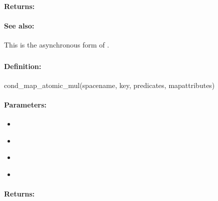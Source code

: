 \paragraph{Returns:}


\paragraph{See also:}  This is the asynchronous form of .

\pagebreak
\subsubsection{}
\label{api:ruby:cond_map_atomic_mul}


\paragraph{Definition:}
\begin{rubycode}
cond_map_atomic_mul(spacename, key, predicates, mapattributes)
\end{rubycode}

\paragraph{Parameters:}
\begin{itemize}[noitemsep]
\item {}\\

\item {}\\

\item {}\\

\item {}\\

\end{itemize}

\paragraph{Returns:}


